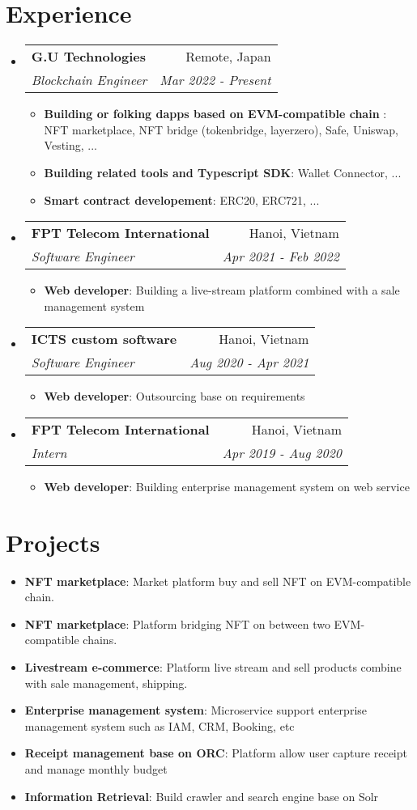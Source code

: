 \documentclass[letterpaper,11pt]{article}
\makeatletter
\newcommand{\resumeItem}[2]{
  \item\small{
    \textbf{#1}{: #2 \vspace{-2pt}}
  }
}
\newcommand{\resumeSubheading}[4]{
  \vspace{-1pt}\item
    \begin{tabular*}{0.97\textwidth}[t]{l@{\extracolsep{\fill}}r}
      \textbf{#1} & #2 \\
      \textit{\small#3} & \textit{\small #4} \\
    \end{tabular*}\vspace{-5pt}
}
\newcommand{\resumeSubItem}[2]{\resumeItem{#1}{#2}\vspace{-4pt}}
\newcommand{\resumeSubHeadingListStart}{\begin{itemize}[leftmargin=*]}
\newcommand{\resumeSubHeadingListEnd}{\end{itemize}}
\newcommand{\resumeItemListStart}{\begin{itemize}}
\newcommand{\resumeItemListEnd}{\end{itemize}\vspace{-5pt}}
\makeatother
\begin{document}
\section{Experience}
  \resumeSubHeadingListStart

    \resumeSubheading
      {G.U Technologies}{Remote, Japan}
      {Blockchain Engineer}{Mar 2022 - Present}
      \resumeItemListStart
        \resumeItem{Building or folking dapps based on EVM-compatible chain }
        {NFT marketplace, NFT bridge (tokenbridge, layerzero), Safe, Uniswap, Vesting, ...}
        \resumeItem{Building related tools and Typescript SDK}
        {Wallet Connector, ...}
        \resumeItem{Smart contract developement}
        {ERC20, ERC721, ...}
      \resumeItemListEnd

    \resumeSubheading
      {FPT Telecom International}{Hanoi, Vietnam}
      {Software Engineer}{Apr 2021 - Feb 2022}
      \resumeItemListStart
        \resumeItem{Web developer}
          {Building a live-stream platform combined with a sale management system}
      \resumeItemListEnd

    \resumeSubheading
      {ICTS custom software}{Hanoi, Vietnam}
      {Software Engineer}{Aug 2020 - Apr 2021}
      \resumeItemListStart
        \resumeItem{Web developer}
          {Outsourcing base on requirements}
      \resumeItemListEnd

    \resumeSubheading
      {FPT Telecom International}{Hanoi, Vietnam}
      {Intern}{Apr 2019 - Aug 2020}
      \resumeItemListStart
        \resumeItem{Web developer}
          {Building enterprise management system on web service}
      \resumeItemListEnd

  \resumeSubHeadingListEnd


\section{Projects}
  \resumeSubHeadingListStart
    \resumeSubItem{NFT marketplace}
      {Market platform buy and sell NFT on EVM-compatible chain.}
    \resumeSubItem{NFT marketplace}
      {Platform bridging NFT on between two EVM-compatible chains.}
    \resumeSubItem{Livestream e-commerce}
      {Platform live stream and sell products combine with sale management, shipping.}
    \resumeSubItem{Enterprise management system}
      {Microservice support enterprise management system such as IAM, CRM, Booking, etc}
    \resumeSubItem{Receipt management base on ORC}
      {Platform allow user capture receipt and manage monthly budget}
    \resumeSubItem{Information Retrieval}
      {Build crawler and search engine base on Solr}
  \resumeSubHeadingListEnd
\end{document}
